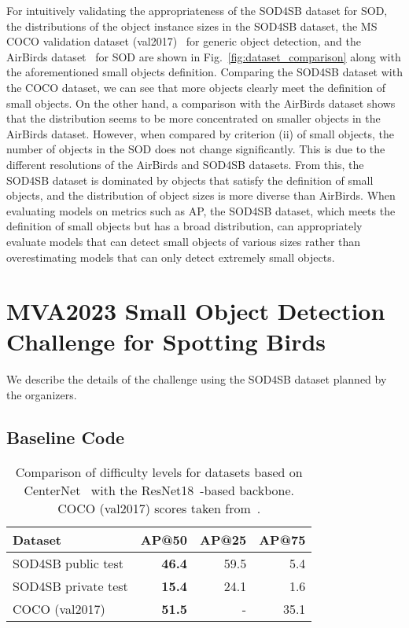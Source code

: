 \documentclass{mva_style}
\begin{document}
For intuitively validating the appropriateness of the SOD4SB dataset for SOD, the distributions of the object instance sizes in the SOD4SB dataset, the MS COCO validation dataset (val2017)~\cite{COCO_ECCV2014} for generic object detection, and the AirBirds dataset~\cite{sun2022airbirds} for SOD are shown in Fig.~\ref{fig:dataset_comparison} along with the aforementioned small objects definition. Comparing the SOD4SB dataset with the COCO dataset, we can see that more objects clearly meet the definition of small objects. On the other hand, a comparison with the AirBirds dataset shows that the distribution seems to be more concentrated on smaller objects in the AirBirds dataset. However, when compared by criterion (ii) of small objects, the number of objects in the SOD does not change significantly. This is due to the different resolutions of the AirBirds and SOD4SB datasets. From this, the SOD4SB dataset is dominated by objects that satisfy the definition of small objects, and the distribution of object sizes is more diverse than AirBirds. When evaluating models on metrics such as AP, the SOD4SB dataset, which meets the definition of small objects but has a broad distribution, can appropriately evaluate models that can detect small objects of various sizes rather than overestimating models that can only detect extremely small objects.

\section{MVA2023 Small Object Detection Challenge for Spotting Birds}

We describe the details of the challenge using the SOD4SB dataset planned by the organizers.

\subsection{Baseline Code}

\begin{table}[t]
  \centering
  \caption{Comparison of difficulty levels for datasets based on CenterNet~\cite{zhou2019objects} with the ResNet18~\cite{he2016deep}-based backbone. COCO (val2017) scores taken from~\cite{zhou2019objects}.}
    \small
    \begin{tabular}{l|rrr}
    \toprule
    Dataset & \multicolumn{1}{c}{\textbf{AP@50}} & \multicolumn{1}{c}{AP@25} & \multicolumn{1}{c}{AP@75} \\
    \midrule
    \midrule
    SOD4SB public test & \textbf{46.4} & 59.5  & 5.4 \\
    SOD4SB private test & \textbf{15.4} & 24.1  & 1.6 \\
    \midrule
    COCO (val2017)~\cite{COCO_ECCV2014} & \textbf{51.5} & - & 35.1\\
    \bottomrule
    \end{tabular}\label{tab:baseline_code}\end{table}
\end{document}
